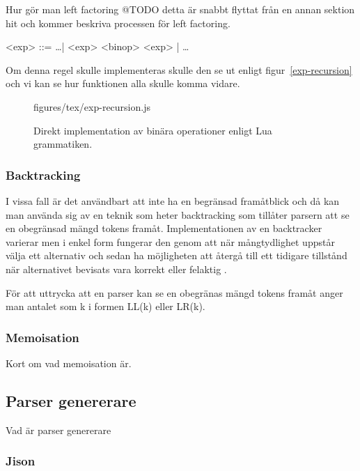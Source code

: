 Hur gör man left factoring @TODO detta är snabbt flyttat från en annan sektion
hit och kommer beskriva processen för left factoring.

\setlength{\grammarindent}{5em}
\begin{grammar}
  \singlespace\small%
  \selectfont
  <exp> ::= \ldots | <exp> <binop> <exp> | \ldots
\end{grammar}

Om denna regel skulle implementeras skulle den se ut enligt
figur~\ref{exp-recursion} och vi kan se hur funktionen alla skulle komma
vidare.

\begin{figure}[ht]
    {figures/tex/exp-recursion.js}
  \caption{Direkt implementation av binära operationer enligt Lua grammatiken.}
  \label{fig:exp-recursion}
\end{figure}

\subsubsection{Backtracking}

I vissa fall är det användbart att inte ha en begränsad framåtblick och då kan
man använda sig av en teknik som heter backtracking som tillåter parsern att
se en obegränsad mängd tokens framåt. Implementationen av en backtracker
varierar men i enkel form fungerar den genom att när mångtydlighet uppstår
välja ett alternativ och sedan ha möjligheten att återgå till ett tidigare
tillstånd när alternativet bevisats vara korrekt eller felaktig \citep[s. 55]{pt10}.

För att uttrycka att en parser kan se en obegränas mängd tokens framåt anger
man antalet som k i formen LL(k) eller LR(k).

\subsubsection{Memoisation}

Kort om vad memoisation är.

\subsection{Parser genererare}

Vad är parser genererare

\subsubsection{Jison}

